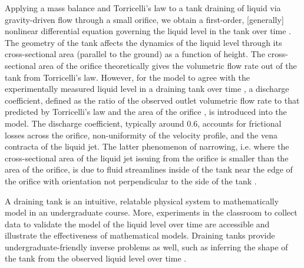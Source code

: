 \documentclass[openacc]{rsproca_new}%
\begin{document}
Applying a mass balance and Torricelli's law to a tank draining of liquid via gravity-driven flow through a small orifice, we obtain a first-order, [generally] nonlinear differential equation governing the liquid level in the tank over time \cite{groetsch1993inverse,seborg2016process,debook}.
The geometry of the tank affects the dynamics of the liquid level through its cross-sectional area (parallel to the ground) as a function of height.
The cross-sectional area of the orifice theoretically gives the volumetric flow rate out of the tank from Torricelli's law. 
However, for the model to agree with the experimentally measured liquid level in a draining tank over time \cite{de2000pin,blasone2015discharge,wadhwa2021study,liu2008drainage}, a discharge coefficient, defined as the ratio of the observed outlet volumetric flow rate to that predicted by Torricelli's law and the area of the orifice \cite{hicks2014determining}, is introduced into the model. 
The discharge coefficient, typically around 0.6,
accounts for frictional losses across the orifice, non-uniformity of the velocity profile, and the vena contracta of the liquid jet.
The latter phenomenon of narrowing, i.e. where the cross-sectional area of the liquid jet issuing from the orifice is smaller than the area of the orifice, is due to fluid streamlines inside of the tank near the edge of the orifice with orientation not perpendicular to the side of the tank \cite{horsch2020simple}. 
\cite{teoman2022discharge,hicks2014determining,blasone2015discharge,lienhard1984velocity,wadhwa2021study}


A draining tank is an intuitive, relatable physical system to mathematically model in an undergraduate course. 
More, experiments in the classroom to collect data to validate the model of the liquid level over time are accessible and illustrate the effectiveness of mathematical models.
\cite{farmer1992physical,driver1998torricelli,brady2009siphons,rother2024modelling,paldy1963apparatus,ivanov2014testing,williams2021vessel,pavesi2019investigating,planinvsivc2011holes,saleta2005experimental,lopac2015water,powell2012carrying}
Draining tanks provide undergraduate-friendly inverse problems \cite{groetsch1993inverse,neto2012introduction,tarantola2005inverse} as well, such as inferring the shape of the tank from the observed liquid level over time \cite{groetsch1993inverse,groetsch1999inverse}. 
\end{document}
